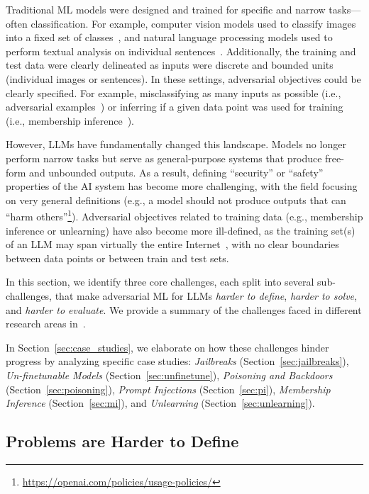 Traditional ML models were designed and trained for specific and narrow tasks---often classification. For example, computer vision models used to classify images into a fixed set of classes~\citep{krizhevsky2012imagenet}, and natural language processing models used to perform textual analysis on individual sentences~\citep{richardson2013mctest,rajpurkar2016squad}. Additionally, the training and test data were clearly delineated as inputs were discrete and bounded units (individual images or sentences). In these settings, adversarial objectives could be clearly specified. For example, misclassifying as many inputs as possible (i.e., adversarial examples~\citep{szegedy2013intriguing,goodfellow2014explaining}) or inferring if a given data point was used for training (i.e., membership inference~\citep{shokri2017membership}).

However, LLMs have fundamentally changed this landscape. Models no longer perform narrow tasks but serve as general-purpose systems that produce free-form and unbounded outputs. As a result, defining ``security'' or ``safety'' properties of the AI system has become more challenging, with the field focusing on very general definitions (e.g., a model should not produce outputs that can ``harm others''\footnote{\scriptsize{\url{https://openai.com/policies/usage-policies/}}}). Adversarial objectives related to training data (e.g., membership inference or unlearning) have also become more ill-defined, as the training set(s) of an LLM may span virtually the entire Internet~\citep{gao2020pile}, with no clear boundaries between data points or between train and test sets.

In this section, we identify three core challenges, each split into several sub-challenges, that make adversarial ML for LLMs \emph{harder to define}, \emph{harder to solve}, and \emph{harder to evaluate}. We provide a summary of the challenges faced in different research areas in~.

In Section~\ref{sec:case_studies}, we elaborate on how these challenges hinder progress by analyzing specific case studies: \emph{Jailbreaks} (Section~\ref{sec:jailbreaks}), 
\emph{Un-finetunable Models} (Section~\ref{sec:unfinetune}),
\emph{Poisoning and Backdoors} (Section~\ref{sec:poisoning}), \emph{Prompt Injections} (Section~\ref{sec:pi}), \emph{Membership Inference} (Section~\ref{sec:mi}), and \emph{Unlearning} (Section~\ref{sec:unlearning}). 

\subsection{Problems are Harder to Define}

